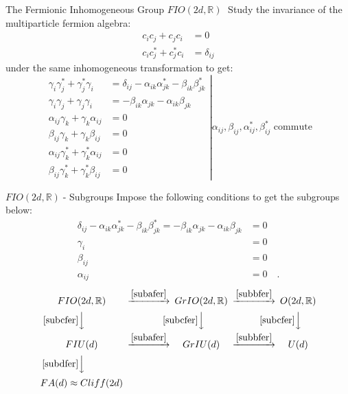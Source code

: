 \documentclass[pdf,colorBG,slideColor,fyma]{prosper}
\def\IR{\mathbb{R}}
\def\FIO{$FIO(2d, \IR)\;$}
\begin{document}
\begin{slide}{The Fermionic Inhomogeneous Group \FIO}
Study the invariance of the multiparticle fermion
algebra:
\begin{align*}
c_i c_j + c_j c_i & = 0 \\
c_i c^*_j + c^*_j c_i & = \delta_{ij}
\end{align*}
under the same inhomogeneous transformation to get:
\[
\left.
\begin{aligned}
\gamma_i \gamma^*_j + \gamma^*_j \gamma_i &= \delta_{ij} - \alpha_{ik}\alpha^*_{jk} - \beta_{ik} \beta^*_{jk} \\
\gamma_i \gamma_j + \gamma_j \gamma_i &= - \beta_{ik} \alpha_{jk} - \alpha_{ik} \beta_{jk} \\
\alpha_{ij} \gamma_k + \gamma_k \alpha_{ij} & = 0 \\
\beta_{ij} \gamma_k + \gamma_k \beta_{ij} & = 0 \\
\alpha_{ij} \gamma^*_k + \gamma^*_k \alpha_{ij} & = 0 \\
\beta_{ij} \gamma^*_k + \gamma^*_k \beta_{ij} & = 0
\end{aligned}
\right|
\text{$\alpha_{ij}, \beta_{ij}, \alpha^*_{ij}, \beta^*_{ij}$ commute}
\]
\end{slide}

\begin{slide}{\FIO - Subgroups}
Impose the following conditions to get the subgroups below:
\begin{subequations}
\begin{align}
\delta_{ij} - \alpha_{ik}\alpha^*_{jk} - \beta_{ik} \beta^*_{jk} = - \beta_{ik} \alpha_{jk} - \alpha_{ik} \beta_{jk} &= 0 \label{subafer} \\
\gamma_i &= 0  \label{subbfer} \\
\beta_{ij} &= 0  \label{subcfer} \\
\alpha_{ij} &= 0  \quad. \label{subdfer}
\end{align}
\end{subequations}
    \[
    \begin{CD}
    {FIO(2d, \IR)}   @> \eqref{subafer} >> {GrIO(2d, \IR)} @> \eqref{subbfer} >> {O(2d, \IR)} \\
    @V\eqref{subcfer}VV                    @V\eqref{subcfer}VV                   @V\eqref{subcfer}VV \\
    {FIU(d)}         @> \eqref{subafer} >> {GrIU(d)}       @> \eqref{subbfer} >> {U(d)} \\
    @V\eqref{subdfer}VV \\
    {FA(d) \approx Cliff(2d)}
    \end{CD}
    \]
\end{slide}
\end{document}
